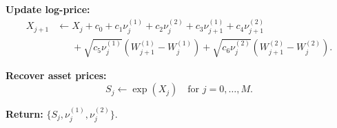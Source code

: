 \documentclass[]{interact}
\theoremstyle{plain}%
\theoremstyle{definition}
\theoremstyle{remark}
\begin{document}
\begin{algorithm}[H]
\begin{algorithmic}[1]
   \State \textbf{Update log-price:}
\begin{align*}
    X_{j+1} &\gets X_j
     + c_0 
     + c_1 \nu_j^{(1)} 
     + c_2 \nu_j^{(2)} 
     + c_3 \nu_{j+1}^{(1)} 
     + c_4 \nu_{j+1}^{(2)} \\
     &\phantom{\gets}+ \sqrt{c_5 \nu_j^{(1)}}(W_{j+1}^{(1)} - W_{j}^{(1)})
     + \sqrt{c_6 \nu_j^{(2)}}(W_{j+1}^{(2)} - W_{j}^{(2)}).
\end{align*}


\EndFor

\State \textbf{Recover asset prices:}
\[
  S_j \gets \exp(X_j) \quad \text{for } j=0,\dots,M.
\]

\State \textbf{Return:} $\{S_j, \nu_j^{(1)}, \nu_j^{(2)}\}$.

\end{algorithmic}
\end{algorithm}







\appendix
\end{document}
